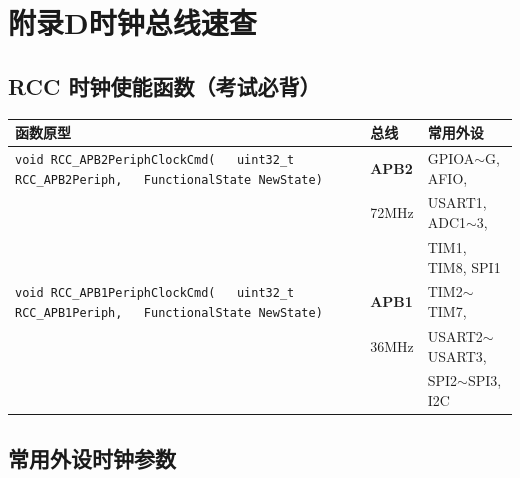 \documentclass[10pt,a4paper,oneside]{ctexart}
\begin{document}
\section*{附录D\quad 时钟总线速查}

\subsection*{RCC 时钟使能函数（考试必背）}

\begin{center}
\begin{tabular}{@{}p{6.2cm}p{2cm}p{3cm}@{}}
    \toprule
    \textbf{函数原型} & \textbf{总线} & \textbf{常用外设} \\
    \midrule
    \texttt{void RCC\_APB2PeriphClockCmd(}\newline\texttt{~~~uint32\_t RCC\_APB2Periph,}\newline\texttt{~~~FunctionalState NewState)} & \textbf{APB2} & GPIOA$\sim$G, AFIO, \\
     & 72MHz & USART1, ADC1$\sim$3, \\
     &  & TIM1, TIM8, SPI1 \\
    \midrule
    \texttt{void RCC\_APB1PeriphClockCmd(}\newline\texttt{~~~uint32\_t RCC\_APB1Periph,}\newline\texttt{~~~FunctionalState NewState)} & \textbf{APB1} & TIM2$\sim$TIM7, \\
     & 36MHz & USART2$\sim$USART3, \\
     &  & SPI2$\sim$SPI3, I2C \\
    \bottomrule
\end{tabular}
\end{center}

\subsection*{常用外设时钟参数}
\end{document}
